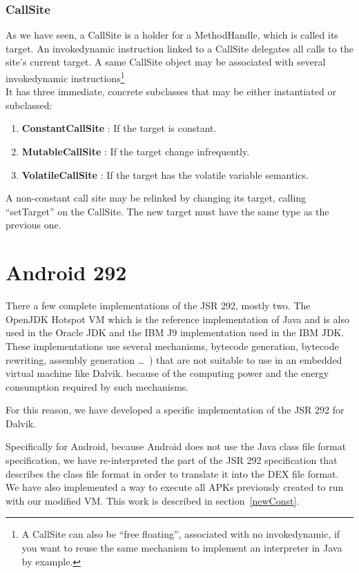 \documentclass{sig-alternate}
\def \DALVIK{Dalvik\xspace}
\def \Jsr{JSR\xspace}
\def \JSR{\Jsr 292\xspace}
\begin{document}
    \subsubsection{CallSite}

      As we have seen, a CallSite is a holder for a MethodHandle, which is called its target.
      An invokedynamic instruction linked to a CallSite delegates all calls to the site's current target.
      A same CallSite object may be associated with several invokedynamic
      instructions\footnote{A CallSite can also be ``free floating'', associated with no invokedynamic,
      if you want to reuse the same mechanism to implement an interpreter in Java by example.}\\

      It has three immediate, concrete subclasses that may be either instantiated or subclassed:
      \begin{enumerate}
        \item \textbf{ConstantCallSite} : If the target is constant.
        \item \textbf{MutableCallSite}  : If the target change infrequently.
        \item \textbf{VolatileCallSite} : If the target has the volatile variable semantics.
      \end{enumerate}
      A non-constant call site may be relinked by changing its target, calling ``setTarget'' on the CallSite.
      The new target must have the same type as the previous one.

\section{Android 292}
  There a few complete implementations of the \JSR, mostly two.
  The OpenJDK Hotspot VM which is the reference implementation of Java and is also used in the Oracle JDK
  and the IBM J9 implementation used in the IBM JDK.
  These implementations use several mechanisms, bytecode generation, bytecode rewriting, assembly generation
  \dots~\cite{jvmsummit-heidinga-mhimpl-2010}\cite{jvmsummit-heidinga-mhimpl-2011}\cite{jvmsummit-rose-mhimpl-2011})
  that are not suitable to use in an embedded virtual machine like \DALVIK.
  because of the computing power and the energy consumption required by such mechanisms.

  For this reason, we have developed a specific implementation of the \JSR for \DALVIK.

  Specifically for Android, because Android does not use the Java class file format specification,
  we have re-interpreted the part of the \JSR specification that describes the class file format
  in order to translate it into the DEX file format.
  We have also implemented a way to execute all APKs previously created to run with our modified VM.
  This work is described in section~\ref{newConst}.
  
\end{document}
